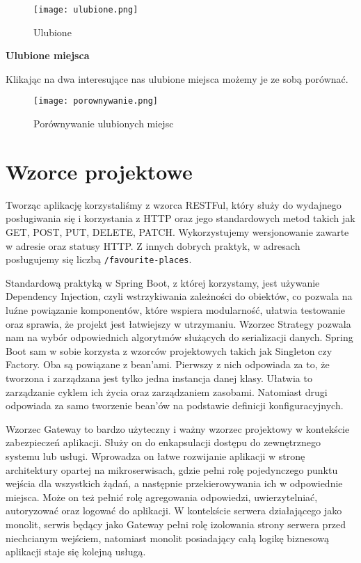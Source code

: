 \documentclass{article}
\begin{document}
\begin{figure}[H]
    \centering
    \texttt{[image: ulubione.png]}
    \caption{Ulubione}
    \label{fig:ulubione}
\end{figure}

\noindent\textbf{Ulubione miejsca}

Klikając na dwa interesujące nas ulubione miejsca możemy je ze sobą porównać.

\begin{figure}[H]
    \centering
    \texttt{[image: porownywanie.png]}
    \caption{Porównywanie ulubionych miejsc}
    \label{fig:porownywanie}
\end{figure}

\section{Wzorce projektowe}

Tworząc aplikację korzystaliśmy z wzorca RESTFul, który służy do wydajnego posługiwania się i korzystania z HTTP oraz jego standardowych metod takich jak GET, POST, PUT, DELETE, PATCH. Wykorzystujemy wersjonowanie zawarte w adresie oraz statusy HTTP. Z innych dobrych praktyk, w adresach posługujemy się liczbą \texttt{/favourite-places}.

Standardową praktyką w Spring Boot, z której korzystamy, jest używanie Dependency Injection, czyli wstrzykiwania zależności do obiektów, co pozwala na luźne powiązanie komponentów, które wspiera modularność, ułatwia testowanie oraz sprawia, że projekt jest łatwiejszy w utrzymaniu. Wzorzec Strategy pozwala nam na wybór odpowiednich algorytmów służących do serializacji danych. Spring Boot sam w sobie korzysta z wzorców projektowych takich jak Singleton czy Factory. Oba są powiązane z bean'ami. Pierwszy z nich odpowiada za to, że tworzona i zarządzana jest tylko jedna instancja danej klasy. Ułatwia to zarządzanie cyklem ich życia oraz zarządzaniem zasobami. Natomiast drugi odpowiada za samo tworzenie bean'ów na podstawie definicji konfiguracyjnych.

Wzorzec Gateway to bardzo użyteczny i ważny wzorzec projektowy w kontekście zabezpieczeń aplikacji. Służy on do enkapsulacji dostępu do zewnętrznego systemu lub usługi. Wprowadza on łatwe rozwijanie aplikacji w stronę architektury opartej na mikroserwisach, gdzie pełni rolę pojedynczego punktu wejścia dla wszystkich żądań, a następnie przekierowywania ich w odpowiednie miejsca. Może on też pełnić rolę agregowania odpowiedzi, uwierzytelniać, autoryzować oraz logować do aplikacji. W kontekście serwera działającego jako monolit, serwis będący jako Gateway pełni rolę izolowania strony serwera przed niechcianym wejściem, natomiast monolit posiadający całą logikę biznesową aplikacji staje się kolejną usługą.
\end{document}

